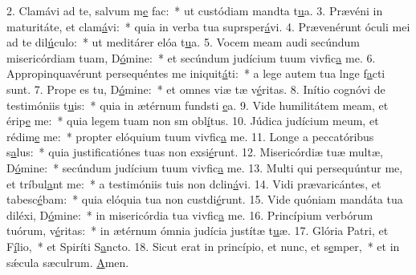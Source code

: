 2. Clamávi ad te, salvum m\uline{e} fac:~* ut custódiam mandta t\uline{u}a.
3. Prævéni in maturitáte, et clam\uline{á}vi:~* quia in verba tua suprsper\uline{á}vi.
4. Prævenérunt óculi mei ad te dil\uline{ú}culo:~* ut meditárer elóa t\uline{u}a.
5. Vocem meam audi secúndum misericórdiam tuam, D\uline{ó}mine:~* et secúndum judícium tuum vivfic\uline{a} me.
6. Appropinquavérunt persequéntes me iniquit\uline{á}ti:~* a lege autem tua lnge f\uline{a}cti sunt.
7. Prope es tu, D\uline{ó}mine:~* et omnes viæ tæ v\uline{é}ritas.
8. Inítio cognóvi de testimóniis t\uline{u}is:~* quia in ætérnum fundsti \uline{e}a.
9. Vide humilitátem meam, et érip\uline{e} me:~* quia legem tuam non sm obl\uline{í}tus.
10. Júdica judícium meum, et rédim\uline{e} me:~* propter elóquium tuum vivfic\uline{a} me.
11. Longe a peccatóribus s\uline{a}lus:~* quia justificatiónes tuas non exsi\uline{é}runt.
12. Misericórdiæ tuæ multæ, D\uline{ó}mine:~* secúndum judícium tuum vivfic\uline{a} me.
13. Multi qui persequúntur me, et tríbul\uline{a}nt me:~* a testimóniis tuis non dclin\uline{á}vi.
14. Vidi prævaricántes, et tabesc\uline{é}bam:~* quia elóquia tua non custdi\uline{é}runt.
15. Vide quóniam mandáta tua diléxi, D\uline{ó}mine:~* in misericórdia tua vivfic\uline{a} me.
16. Princípium verbórum tuórum, v\uline{é}ritas:~* in ætérnum ómnia judícia justítæ t\uline{u}æ.
17. Glória Patri, et F\uline{í}lio,~* et Spiríti S\uline{a}ncto.
18. Sicut erat in princípio, et nunc, et s\uline{e}mper,~* et in sǽcula sæculrum. \uline{A}men.

